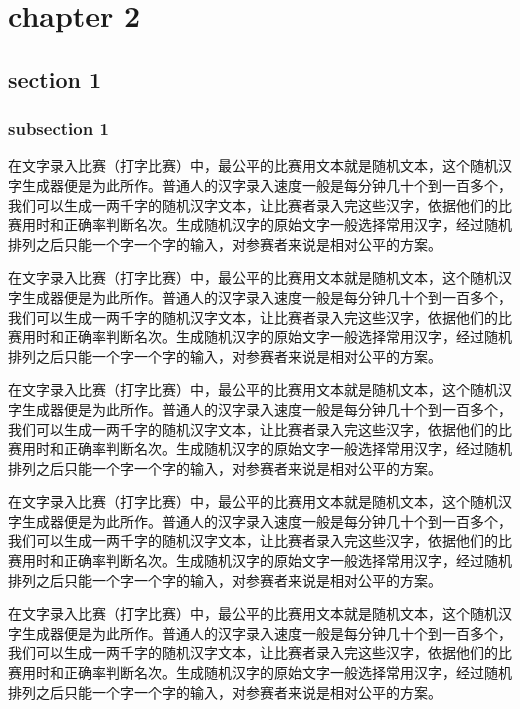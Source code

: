\documentclass[12pt,hyperref,UTF8]{ctexbook}
\begin{document}
\cleardoublepage
\chapter{chapter 2}

\section{section 1}

\subsection{subsection 1}

在文字录入比赛（打字比赛）中，最公平的比赛用文本就是随机文本，这个随机汉字生成器便是为此所作。普通人的汉字录入速度一般是每分钟几十个到一百多个，我们可以生成一两千字的随机汉字文本，让比赛者录入完这些汉字，依据他们的比赛用时和正确率判断名次。生成随机汉字的原始文字一般选择常用汉字，经过随机排列之后只能一个字一个字的输入，对参赛者来说是相对公平的方案。

在文字录入比赛（打字比赛）中，最公平的比赛用文本就是随机文本，这个随机汉字生成器便是为此所作。普通人的汉字录入速度一般是每分钟几十个到一百多个，我们可以生成一两千字的随机汉字文本，让比赛者录入完这些汉字，依据他们的比赛用时和正确率判断名次。生成随机汉字的原始文字一般选择常用汉字，经过随机排列之后只能一个字一个字的输入，对参赛者来说是相对公平的方案。

在文字录入比赛（打字比赛）中，最公平的比赛用文本就是随机文本，这个随机汉字生成器便是为此所作。普通人的汉字录入速度一般是每分钟几十个到一百多个，我们可以生成一两千字的随机汉字文本，让比赛者录入完这些汉字，依据他们的比赛用时和正确率判断名次。生成随机汉字的原始文字一般选择常用汉字，经过随机排列之后只能一个字一个字的输入，对参赛者来说是相对公平的方案。

在文字录入比赛（打字比赛）中，最公平的比赛用文本就是随机文本，这个随机汉字生成器便是为此所作。普通人的汉字录入速度一般是每分钟几十个到一百多个，我们可以生成一两千字的随机汉字文本，让比赛者录入完这些汉字，依据他们的比赛用时和正确率判断名次。生成随机汉字的原始文字一般选择常用汉字，经过随机排列之后只能一个字一个字的输入，对参赛者来说是相对公平的方案。

在文字录入比赛（打字比赛）中，最公平的比赛用文本就是随机文本，这个随机汉字生成器便是为此所作。普通人的汉字录入速度一般是每分钟几十个到一百多个，我们可以生成一两千字的随机汉字文本，让比赛者录入完这些汉字，依据他们的比赛用时和正确率判断名次。生成随机汉字的原始文字一般选择常用汉字，经过随机排列之后只能一个字一个字的输入，对参赛者来说是相对公平的方案。
\end{document}
